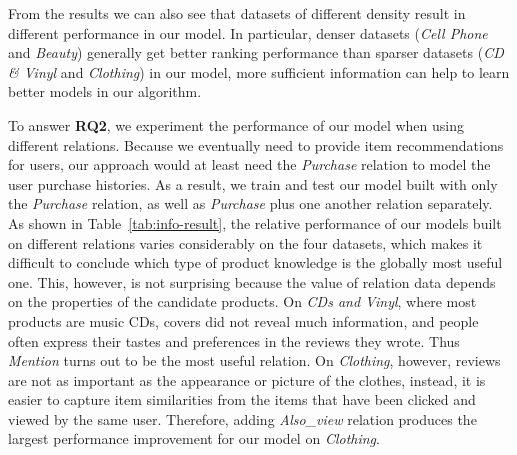 \documentclass[algorithms,article,accept,moreauthors,pdftex,10pt,a4paper]{Definitions/mdpi}
\begin{document}
From the results we can also see that datasets of different density result in different performance in our model. In particular, denser datasets (\textit{Cell Phone} and \textit{Beauty}) generally get better ranking performance than sparser datasets (\textit{CD \& Vinyl} and \textit{Clothing}) in our model,  more sufficient information can help to learn better models in our algorithm.










To answer \textbf{RQ2}, we experiment the performance of our model when using different relations. Because we eventually need to provide item recommendations
for users, our approach would at least need the \textit{Purchase} relation to model the user purchase histories. As a result, we train and test our model built with only the \textit{Purchase} relation, as well as \textit{Purchase} plus one another relation separately.
As shown in Table~\ref{tab:info-result}, the relative performance of our models built on different relations varies considerably on the four datasets, which makes it difficult to conclude which type of product knowledge is the globally most useful one.
This, however, is not surprising because the value of relation data depends on the properties of the candidate products.
On \textit{CDs and Vinyl}, where most products are music CDs,  covers did not reveal much information, and people often express their tastes and preferences in the reviews they wrote. Thus \textit{Mention} turns out to be the most useful relation.
On \textit{Clothing}, however, reviews are not as important as the appearance or picture of the clothes, instead, it is easier to capture item similarities from the items that have been clicked and viewed by the same user.
Therefore, adding \textit{Also\_view} relation produces the largest performance improvement for our model on \textit{Clothing}.
\end{document}
